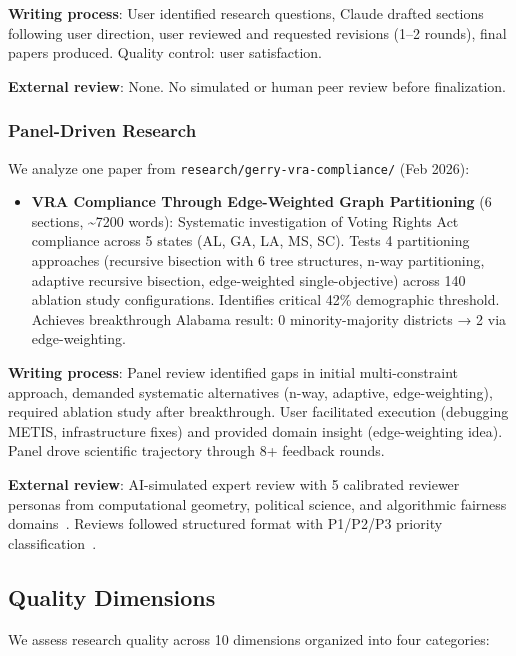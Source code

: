 \textbf{Writing process}: User identified research questions, Claude drafted sections following user direction, user reviewed and requested revisions (1--2 rounds), final papers produced. Quality control: user satisfaction.

\textbf{External review}: None. No simulated or human peer review before finalization.

\subsubsection{Panel-Driven Research}

We analyze one paper from \texttt{research/gerry-vra-compliance/} (Feb 2026):

\begin{itemize}[leftmargin=*]
\item \textbf{VRA Compliance Through Edge-Weighted Graph Partitioning} (6 sections, \textasciitilde7200 words): Systematic investigation of Voting Rights Act compliance across 5 states (AL, GA, LA, MS, SC). Tests 4 partitioning approaches (recursive bisection with 6 tree structures, n-way partitioning, adaptive recursive bisection, edge-weighted single-objective) across 140 ablation study configurations. Identifies critical 42\% demographic threshold. Achieves breakthrough Alabama result: 0 minority-majority districts → 2 via edge-weighting.
\end{itemize}

\textbf{Writing process}: Panel review identified gaps in initial multi-constraint approach, demanded systematic alternatives (n-way, adaptive, edge-weighting), required ablation study after breakthrough. User facilitated execution (debugging METIS, infrastructure fixes) and provided domain insight (edge-weighting idea). Panel drove scientific trajectory through 8+ feedback rounds.

\textbf{External review}: AI-simulated expert review with 5 calibrated reviewer personas from computational geometry, political science, and algorithmic fairness domains~\cite{dellalibera2026calibration}. Reviews followed structured format with P1/P2/P3 priority classification~\cite{dellalibera2026synthesis}.

\subsection{Quality Dimensions}

We assess research quality across 10 dimensions organized into four categories:

